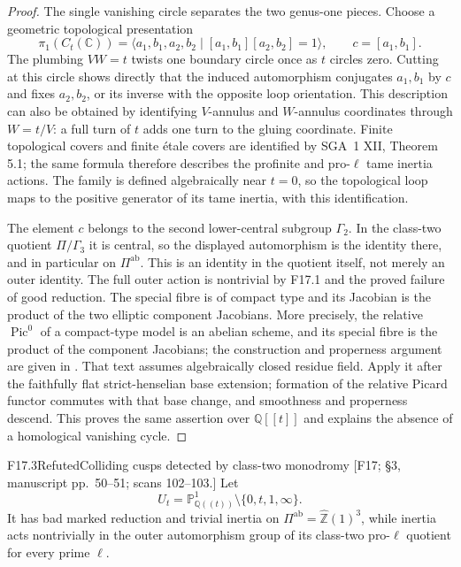 \begin{proof}
The single vanishing circle separates the two genus-one pieces.
Choose a geometric topological presentation
\[
 \pi_1(C_t(\mathbb C))=
 \langle a_1,b_1,a_2,b_2\mid[a_1,b_1][a_2,b_2]=1\rangle,
 \qquad c=[a_1,b_1].
\]
The plumbing $VW=t$ twists one boundary circle once as $t$ circles
zero. Cutting at this circle shows directly that the induced
automorphism conjugates $a_1,b_1$ by $c$ and fixes $a_2,b_2$, or
its inverse with the opposite loop orientation. This description
can also be obtained by identifying $V$-annulus and $W$-annulus
coordinates through $W=t/V$: a full turn of $t$ adds one turn to
the gluing coordinate. Finite topological covers and finite \'etale
covers are identified by SGA~1 XII, Theorem 5.1; the same formula
therefore describes the profinite and pro-$\ell$ tame inertia actions.
The family is defined algebraically near $t=0$, so the topological
loop maps to the positive generator of its tame inertia, with this
identification.

The element $c$ belongs to the second lower-central subgroup
$\Gamma_2$. In the class-two quotient $\Pi/\Gamma_3$ it is central,
so the displayed automorphism is the identity there, and in
particular on $\Pi^{\mathrm{ab}}$. This is an identity in the
quotient itself, not merely an outer identity. The full outer
action is nontrivial by F17.1 and the proved failure of good
reduction. The special fibre is of compact type and its Jacobian
is the product of the two elliptic component Jacobians. More
precisely, the relative $\operatorname{Pic}^0$ of a compact-type
model is an abelian scheme, and its special fibre is the product
of the component Jacobians; the construction and properness
argument are given in \cite[\S1, p.\ 1]{CF_DupuyRabinoff2017}.
That text assumes algebraically closed residue field. Apply it
after the faithfully flat strict-henselian base extension;
formation of the relative Picard functor commutes with that base
change, and smoothness and properness descend. This proves the
same assertion over $\mathbb Q[[t]]$ and explains the absence
of a homological vanishing cycle.
\end{proof}

\begin{result}{F17.3}{Refuted}{Colliding cusps detected by class-two monodromy}
\textup{[F17; \S3, manuscript pp.\ 50--51; scans 102--103.]}
Let
\[
 U_t=\mathbb P^1_{\mathbb Q((t))}\setminus\{0,t,1,\infty\}.
 \tag{F.5}
\]
It has bad marked reduction and trivial inertia on
$\Pi^{\mathrm{ab}}=\widehat{\mathbb Z}(1)^3$, while inertia acts
nontrivially in the outer automorphism group of its class-two
pro-$\ell$ quotient for every prime $\ell$.
\end{result}

